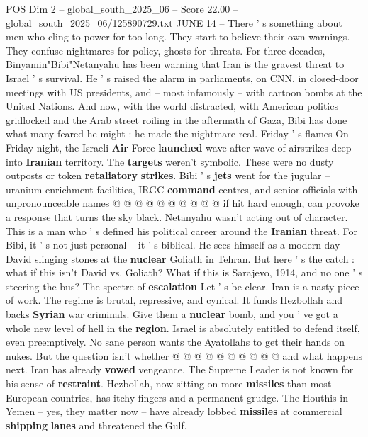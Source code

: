 \begin{textsample}{POS Dim 2 – global\_south\_2025\_06 – Score 22.00 – global\_south\_2025\_06/125890729.txt}  \label{ex:f2_pos_245}
JUNE 14 -- There ' s something about men who cling to power for too long.
They start to believe their own warnings.
They confuse nightmares for policy, ghosts for threats.
For three decades, Binyamin"Bibi"Netanyahu has been warning that Iran is the gravest threat to Israel ' s survival.
He ' s raised the alarm in parliaments, on CNN, in closed-door meetings with US presidents, and -- most infamously -- with cartoon bombs at the United Nations.
And now, with the world distracted, with American politics gridlocked and the Arab street roiling in the aftermath of Gaza, Bibi has done what many feared he might : he made the nightmare real.
Friday ' s flames On Friday night, the Israeli \textbf{Air} Force \textbf{launched} wave after wave of airstrikes deep into \textbf{Iranian} territory.
The \textbf{targets} weren't symbolic.
These were no dusty outposts or token \textbf{retaliatory} \textbf{strikes}.
Bibi ' s \textbf{jets} went for the jugular -- uranium enrichment facilities, IRGC \textbf{command} centres, and senior officials with unpronounceable names @ @ @ @ @ @ @ @ @ @ if hit hard enough, can provoke a response that turns the sky black.
Netanyahu wasn't acting out of character.
This is a man who ' s defined his political career around the \textbf{Iranian} threat.
For Bibi, it ' s not just personal -- it ' s biblical.
He sees himself as a modern-day David slinging stones at the \textbf{nuclear} Goliath in Tehran.
But here ' s the catch : what if this isn't David vs.
Goliath?
What if this is Sarajevo, 1914, and no one ' s steering the bus?
The spectre of \textbf{escalation} Let ' s be clear.
Iran is a nasty piece of work.
The regime is brutal, repressive, and cynical.
It funds Hezbollah and backs \textbf{Syrian} war criminals.
Give them a \textbf{nuclear} bomb, and you ' ve got a whole new level of hell in the \textbf{region}.
Israel is absolutely entitled to defend itself, even preemptively.
No sane person wants the Ayatollahs to get their hands on nukes.
But the question isn't whether @ @ @ @ @ @ @ @ @ @ and what happens next.
Iran has already \textbf{vowed} vengeance.
The Supreme Leader is not known for his sense of \textbf{restraint}.
Hezbollah, now sitting on more \textbf{missiles} than most European countries, has itchy fingers and a permanent grudge.
The Houthis in Yemen -- yes, they matter now -- have already lobbed \textbf{missiles} at commercial \textbf{shipping} \textbf{lanes} and threatened the Gulf.

\end{textsample}
